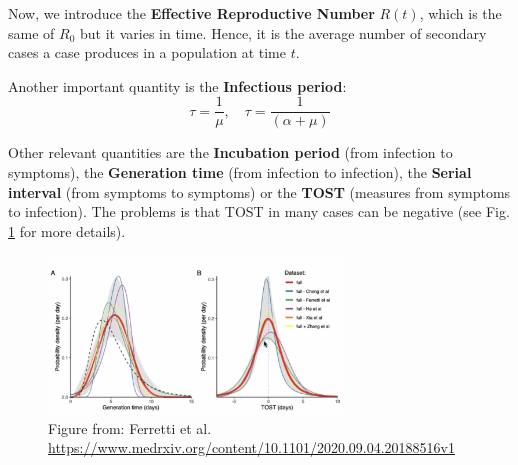 \documentclass[../main/main.tex]{subfiles}
\begin{document}
Now, we introduce the \textbf{Effective Reproductive Number} \( R(t) \), which is the same of \( R_0 \) but it varies in time. Hence, it is the average number of secondary cases a case produces in a population at time \( t \).

Another important quantity is the \textbf{Infectious period}:
\begin{equation}
  \tau = \frac{1}{\mu }, \quad \tau = \frac{1}{(\alpha + \mu )}
\end{equation}

Other relevant quantities are the \textbf{Incubation period} (from infection to symptoms), the \textbf{Generation time} (from infection to infection), the \textbf{Serial interval} (from symptoms to symptoms) or the \textbf{TOST} (measures from symptoms to infection). The problems is that TOST in many cases can be negative (see Fig. \ref{fig:4_TOST} for more details).

\begin{figure}[h!]
\centering
\includegraphics[width=0.7\textwidth]{../lessons/image/02/4_TOST.png}
\caption{\label{fig:4_TOST} Figure from: Ferretti et al. \url{https://www.medrxiv.org/content/10.1101/2020.09.04.20188516v1}}
\end{figure}
\end{document}
